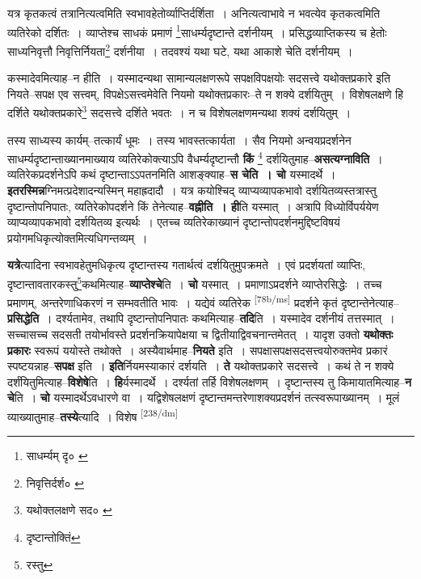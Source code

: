 \documentclass[article,12pt,a4paper]{memoir}
\begin{document}
	यत्र कृतकत्वं तत्रानित्यत्वमिति स्वभावहेतोर्व्याप्तिर्दर्शिता । अनित्यत्वाभावे न भवत्येव कृतकत्वमिति व्यतिरेको दर्शितः । व्याप्तेश्च साधकं प्रमाणं \footnote{साधर्म्यम् दृ० \cite{dp-msB}}साधर्म्यदृष्टान्ते दर्शनीयम् । प्रसिद्धव्याप्तिकस्य च हेतोः साध्यनिवृत्तौ निवृत्तिर्नियता\footnote{निवृत्तिर्दर्श० \cite{dp-msA} \cite{dp-msB} \cite{dp-msD} \cite{dp-edP} \cite{dp-edH} \cite{dp-edN} \cite{dp-edE}} दर्शनीया । तदवश्यं यथा घटे, यथा आकाशे चेति दर्शनीयम् । 
	  
	कस्मादेवमित्याह--न हीति । यस्मादन्यथा सामान्यलक्षणरूपे सपक्षविपक्षयोः सदसत्त्वे यथोक्तप्रकारे इति नियते--सपक्ष एव सत्त्वम्, विपक्षेऽसत्त्वमेवेति नियमो यथोक्तप्रकारः--ते न शक्ये दर्शयितुम् । विशेषलक्षणे हि दर्शिते यथोक्तप्रकारे\footnote{यथोक्तलक्षणे सद० \cite{dp-msC}} सदसत्त्वे दर्शिते भवतः । न च विशेषलक्षणमन्यथा शक्यं दर्शयितुम् । 
	  
	तस्य साध्यस्य कार्यम्--तत्कार्यं धूमः । तस्य भावस्तत्कार्यता । सैव नियमो अन्वयप्रदर्शनेन साधर्म्यदृष्टान्ताख्यानमाख्याय व्यतिरेकोक्त्याऽपि वैधर्म्यदृष्टान्तौ \textbf{किं} \footnote{दृष्टान्तोक्तिं} दर्शयितुमाह--\textbf{असत्यग्नाविति} । व्यतिरेकप्रदर्शनेऽपि कथं दृष्टान्ताऽऽपतनमिति आशङ्क्याह--\textbf{स चेति । चो} यस्मादर्थे । \textbf{इतरस्मिन्न}ग्निमत्प्रदेशादन्यस्मिन् महाह्रदादौ । यत्र कयोश्चिद् व्याप्यव्यापकभावो दर्शयितव्यस्तत्रास्तु दृष्टान्तोपनिपातः, व्यतिरेकोपदर्शने किं तेनेत्याह--\textbf{वह्नीति । ही}ति यस्मात् । अत्रापि विध्योर्विपर्ययेण व्याप्यव्यापकभावो दर्शयितव्य इत्यर्थः । एतच्च व्यतिरेकाख्यानं दृष्टान्तोपदर्शनमुद्दिष्टविषयं प्रयोगमधिकृत्योक्तमित्यधिगन्तव्यम् ।
	\pend
      

	  \pstart \textbf{यत्रे}त्यादिना स्वभावहेतुमधिकृत्य दृष्टान्तस्य गतार्थत्वं दर्शयितुमुपक्रमते । एवं प्रदर्शयतां व्याप्तिः, दृष्टान्तावतारकस्तु\footnote{रस्तु}कथमित्याह--\textbf{व्याप्तेश्चे}ति । \textbf{चो} यस्मात् । प्रमाणाऽप्रदर्शने व्याप्तेरसिद्धेः । तच्च प्रमाणम्, अन्तरेणाधिकरणं न सम्भवतीति भावः । यद्येवं व्यतिरेक \leavevmode\textsuperscript{\rmlatinfont\tiny [78b/ms]} प्रदर्शने कृतं दृष्टान्तेनेत्याह--\textbf{प्रसिद्धेति} । दर्श्यतामेव, तथापि दृष्टान्तोपनिपातः कथमित्याह--\textbf{तदि}ति । यस्मादेव दर्शनीयं तत्तस्मात् । सच्चासच्च सदसती तयोर्भावस्ते प्रदर्शनक्रियापेक्षया च द्वितीयाद्विवचनान्तमेतत् । यादृश उक्तो \textbf{यथोक्तः प्रकारः} स्वरूपं ययोस्ते तथोक्ते । अस्यैवार्थमाह--\textbf{नियते} इति । सपक्षासपक्षसदसत्त्वयोरुक्तमेव प्रकारं स्पष्टयन्नाह--\textbf{सपक्ष} इति । \textbf{इति}र्नियमस्याकारं दर्शयति । \textbf{ते} यथोक्तप्रकारे सदसत्त्वे । कथं ते न शक्ये दर्शंयितुमित्याह--\textbf{विशेषे}ति । \textbf{हि}र्यस्मादर्थे । दर्श्यतां तर्हि विशेषलक्षणम् । दृष्टान्तस्य तु किमायातमित्याह--\textbf{न चे}ति । \textbf{चो} यस्मादर्थेऽवधारणे वा । यद्विशेषलक्षणं दृष्टान्तमन्तरेणाशक्यप्रदर्शनं तत्स्वरूपाख्यानम् । मूलं व्याख्यातुमाह--\textbf{तस्ये}त्यादि । विशेष  \leavevmode\textsuperscript{\rmlatinfont\tiny [238/dm]} 
	  
\end{document}
